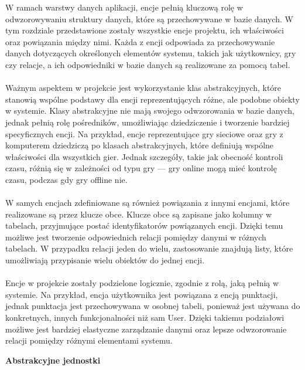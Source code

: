 \documentclass[twoside]{projektInzynierskiMS1}
\begin{document}
\noindent
W ramach warstwy danych aplikacji, encje pełnią kluczową rolę w odwzorowywaniu struktury danych, które są przechowywane w bazie danych. W tym rozdziale przedstawione zostały wszystkie encje projektu, ich właściwości oraz powiązania między nimi. Każda z encji odpowiada za przechowywanie danych dotyczących określonych elementów systemu, takich jak użytkownicy, gry czy relacje, a ich odpowiedniki w bazie danych są realizowane za pomocą tabel.
\\\\
Ważnym aspektem w projekcie jest wykorzystanie klas abstrakcyjnych, które stanowią wspólne podstawy dla encji reprezentujących różne, ale podobne obiekty w systemie. Klasy abstrakcyjne nie mają swojego odwzorowania w bazie danych, jednak pełnią rolę pośredników, umożliwiając dziedziczenie i tworzenie bardziej specyficznych encji. Na przykład, encje reprezentujące gry sieciowe oraz gry z komputerem dziedziczą po klasach abstrakcyjnych, które definiują wspólne właściwości dla wszystkich gier. Jednak szczegóły, takie jak obecność kontroli czasu, różnią się w zależności od typu gry — gry online mogą mieć kontrolę czasu, podczas gdy gry offline nie.
\\\\
W samych encjach zdefiniowane są również powiązania z innymi encjami, które realizowane są przez klucze obce. Klucze obce są zapisane jako kolumny w tabelach, przyjmujące postać identyfikatorów powiązanych encji. Dzięki temu możliwe jest tworzenie odpowiednich relacji pomiędzy danymi w różnych tabelach. W przypadku relacji jeden do wielu, zastosowanie znajdują listy, które umożliwiają przypisanie wielu obiektów do jednej encji.
\\\\
Encje w projekcie zostały podzielone logicznie, zgodnie z rolą, jaką pełnią w systemie. Na przykład, encja użytkownika jest powiązana z encją punktacji, jednak punktacja jest przechowywana w osobnej tabeli, ponieważ jest używana do konkretnych, innych funkcjonalności niż sam User. Dzięki takiemu podziałowi możliwe jest bardziej elastyczne zarządzanie danymi oraz lepsze odwzorowanie relacji pomiędzy różnymi elementami systemu.

\newpage

\noindent \textbf{Abstrakcyjne jednostki}\\
\end{document}
